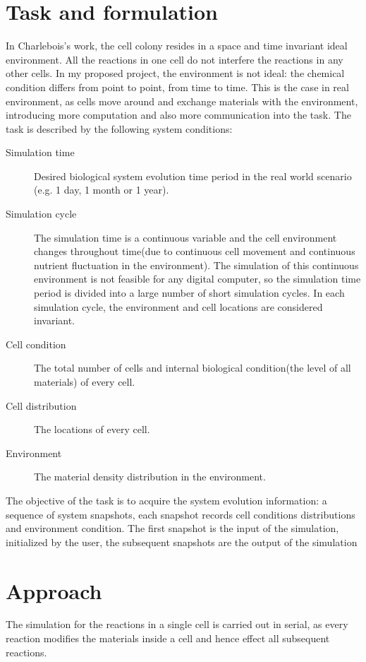 \documentclass[12pt]{article}
\begin{document}
\section{Task and formulation}
In Charlebois's work, the cell colony resides in a space and time invariant ideal environment. All the reactions in one cell do not interfere the reactions in any other cells. In my proposed project, the environment is not ideal: the chemical condition differs from point to point, from time to time. This is the case in real environment, as cells move around and exchange materials with the environment, introducing more computation and also more communication into the task. The task is described by the following system conditions:
\begin{description}
  \item[Simulation time] Desired biological system evolution time period in the real world scenario (e.g. 1 day, 1 month or 1 year).
  \item[Simulation cycle] The simulation time is a continuous variable and the cell environment changes throughout time(due to continuous cell movement and continuous nutrient fluctuation in the environment). The simulation of this continuous environment is not feasible for any digital computer, so the simulation time period is divided into a large number of short simulation cycles. In each simulation cycle, the environment and cell locations are considered invariant.
  \item[Cell condition] The total number of cells and internal biological condition(the level of all materials) of every cell.
  \item[Cell distribution] The locations of every cell.
  \item[Environment] The material density distribution in the environment.
\end{description}
The objective of the task is to acquire the system evolution information: a sequence of system snapshots, each snapshot records cell conditions distributions and environment condition. The first snapshot is the input of the simulation, initialized by the user, the subsequent snapshots are the output of the simulation

\section{Approach}
The simulation for the reactions in a single cell is carried out in serial, as every reaction modifies the materials inside a cell and hence effect all subsequent reactions. 
\end{document}
